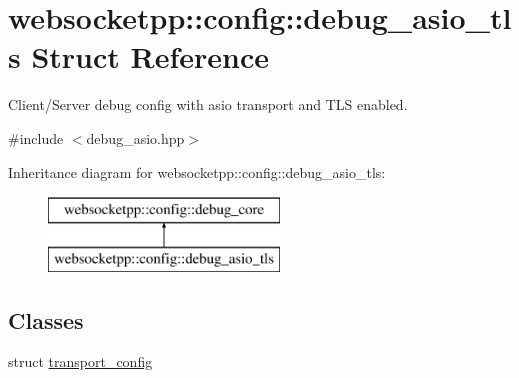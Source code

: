 \hypertarget{structwebsocketpp_1_1config_1_1debug__asio__tls}{}\section{websocketpp\+:\+:config\+:\+:debug\+\_\+asio\+\_\+tls Struct Reference}
\label{structwebsocketpp_1_1config_1_1debug__asio__tls}


Client/\+Server debug config with asio transport and T\+L\+S enabled.  




{\ttfamily \#include $<$debug\+\_\+asio.\+hpp$>$}

Inheritance diagram for websocketpp\+:\+:config\+:\+:debug\+\_\+asio\+\_\+tls\+:\begin{figure}[H]
\begin{center}
\leavevmode
\includegraphics[height=2.000000cm]{structwebsocketpp_1_1config_1_1debug__asio__tls}
\end{center}
\end{figure}
\subsection*{Classes}
\begin{DoxyCompactItemize}
\item 
struct \hyperlink{structwebsocketpp_1_1config_1_1debug__asio__tls_1_1transport__config}{transport\+\_\+config}
\end{DoxyCompactItemize}
